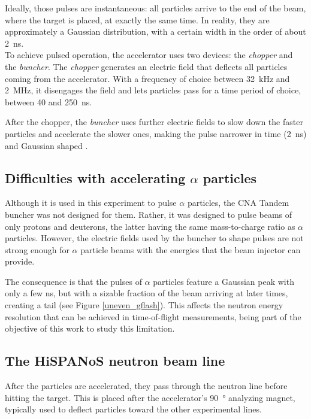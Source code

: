\documentclass[a4paper,12pt]{report}
\begin{document}
Ideally, those pulses are instantaneous: all particles arrive to the end of the beam, where the target is placed, at exactly the same time.
In reality, they are approximately a Gaussian distribution, with a certain width in the order of about \qty{2}{\nano\second}.
\\

To achieve pulsed operation, the accelerator uses two devices: the \textit{chopper} and the \textit{buncher}.
The \textit{chopper} generates an electric field that deflects all particles coming from the accelerator.
With a frequency of choice between \qty{32}{\kilo\Hz} and \qty{2}{\mega\Hz}, it disengages the field and lets particles pass for a time period of choice, between 40 and \qty{250}{\nano\second}.

After the chopper, the \textit{buncher} uses further electric fields to slow down the faster particles and accelerate the slower ones, making the pulse narrower in time (\qty{2}{\nano\second}) and Gaussian shaped \cite{hispanos}.
\\

\subsection{Difficulties with accelerating $\alpha$ particles}
Although it is used in this experiment to pulse $\alpha$ particles, the CNA Tandem buncher was not designed for them.
Rather, it was designed to pulse beams of only protons and deuterons, the latter having the same mass-to-charge ratio as $\alpha$ particles.
However, the electric fields used by the buncher to shape pulses are not strong enough for $\alpha$ particle beams with the energies that the beam injector can provide.

The consequence is that the pulses of $\alpha$ particles feature a Gaussian peak with only a few \unit{\nano\second}, but with a sizable fraction of the beam arriving at later times, creating a tail (see Figure \ref{uneven_gflash}).
This affects the neutron energy resolution that can be achieved in time-of-flight measurements, being part of the objective of this work to study this limitation.
\\

\subsection{The HiSPANoS neutron beam line}
After the particles are accelerated, they pass through the neutron line before hitting the target.
This is placed after the accelerator's \qty{90}{\degree} analyzing magnet, typically used to deflect particles toward the other experimental lines.
\end{document}

